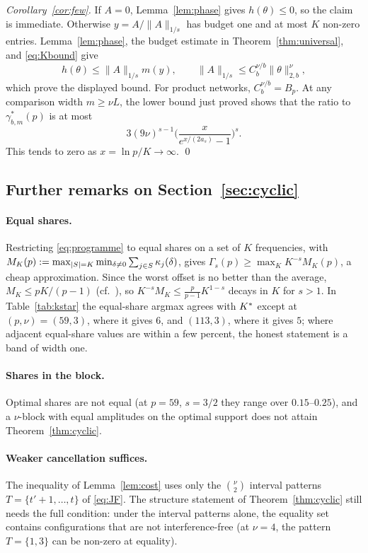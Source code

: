 \emph{Corollary~\ref{cor:few}.} If $A=0$, Lemma~\ref{lem:phase} gives $h(\theta)\le0$, so the claim is immediate. Otherwise $y=A/\|A\|_{1/s}$ has budget one and at most $K$ non-zero entries. Lemma~\ref{lem:phase}, the budget estimate in Theorem~\ref{thm:universal}, and \eqref{eq:Kbound} give
\[
h(\theta)\le\|A\|_{1/s}m(y),\qquad
\|A\|_{1/s}\le C_b^{\nu/b}\|\theta\|_{2,b}^\nu,
\]
which prove the displayed bound. For product networks, $C_b^{\nu/b}=B_p$. At any comparison width $m\ge\nu L$, the lower bound just proved shows that the ratio to $\gamma^*_{b,m}(p)$ is at most
\[
3(9\nu)^{s-1}\Big(\frac{x}{e^{x/(2a_s)}-1}\Big)^s.
\]
This tends to zero as $x=\ln p/K\to\infty$. \qed

\subsection{Further remarks on Section~\ref{sec:cyclic}}\label{app:remarks}

\paragraph{Equal shares.} Restricting \eqref{eq:programme} to equal shares on a set of $K$ frequencies, with $M_K(p):=\max_{|S|=K}\min_{\delta\neq0}\sum_{j\in S}\kappa_{j}(\delta)$, gives $\Gamma_s(p)\ge\max_KK^{-s}M_K(p)$, a cheap approximation. Since the worst offset is no better than the average, $M_K\le pK/(p-1)$ (cf.\ \citealp[Thm.~2]{slepian1968group}), so $K^{-s}M_K\le\frac p{p-1}K^{1-s}$ decays in $K$ for $s>1$. In Table~\ref{tab:kstar} the equal-share argmax agrees with $K^{*}$ except at $(p,\nu)=(59,3)$, where it gives $6$, and $(113,3)$, where it gives $5$; where adjacent equal-share values are within a few percent, the honest statement is a band of width one.

\paragraph{Shares in the block.} Optimal shares are not equal (at $p=59$, $s=3/2$ they range over $0.15$--$0.25$), and a $\nu$-block with equal amplitudes on the optimal support does not attain Theorem~\ref{thm:cyclic}.

\paragraph{Weaker cancellation suffices.} The inequality of Lemma~\ref{lem:cost} uses only the $\binom\nu2$ interval patterns $T=\{t'+1,\dots,t\}$ of \eqref{eq:JF}. The structure statement of Theorem~\ref{thm:cyclic} still needs the full condition: under the interval patterns alone, the equality set contains configurations that are not interference-free (at $\nu=4$, the pattern $T=\{1,3\}$ can be non-zero at equality).

